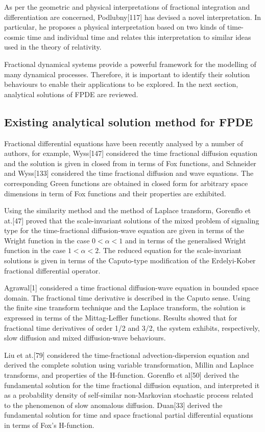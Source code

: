 {As per the geometric and physical interpretations of fractional integration and differentiation are concerned, Podlubny[117] has devised a novel interpretation. In particular, he proposes a physical interpretation based on two kinds of time-cosmic time and individual time and relates this interpretation to similar ideas used in the theory of relativity.\

Fractional dynamical systems provide a powerful framework for the modelling of many dynamical processes. Therefore, it is important to identify their solution behaviours to enable their applications to be explored. In the next section, analytical solutions of FPDE are reviewed.

\chead{}
\subsection{Existing analytical solution method for FPDE}
Fractional differential equations have been recently analysed by a number of authors, for example, Wyss[147] considered the time fractional diffusion equation and the solution is given in closed from in terms of Fox functions, and Schneider and Wyss[133] considered the time fractional diffusion and wave equations. The corresponding Green functions are obtained in closed form for arbitrary space dimensions in term of Fox functions and their properties are exhibited. \

Using the similarity method and the method of Laplace transform, Gorenflo et at.[47] proved that the scale-invariant solutions of the mixed problem of signaling type for the time-fractional diffusion-wave equation are given in terms of the Wright function in the case $0< \alpha < 1$ and in terms of the generalised Wright function in the case $1< \alpha <2$. The reduced equation for the scale-invariant solutions is given in terms of the Caputo-type modification of the Erdelyi-Kober fractional differential operator.\

Agrawal[1] considered a time fractional diffusion-wave equation in bounded space domain. The fractional time derivative is described in the Caputo sense. Using the finite sine transform technique and the Laplace transform, the solution is expressed in terms of the Mittag-Leffler functions. Results showed that for fractional time derivatives of order 1/2 and 3/2, the system exhibits, respectively, slow diffusion and mixed diffusion-wave behaviours.\

Liu et at.[79] considered the time-fractional advection-dispersion equation and derived the complete solution using variable transformation, Millin and Laplace transforms, and properties of the H-function. Gorenflo et al[50] derived the fundamental solution for the time fractional diffusion equation, and interpreted it as a probability density of self-similar non-Markovian stochastic process related to the phenomenon of slow anomalous diffusion. Duan[33] derived the fundamental solution for time and space fractional partial differential equations in terms of Fox's H-function.\

}
